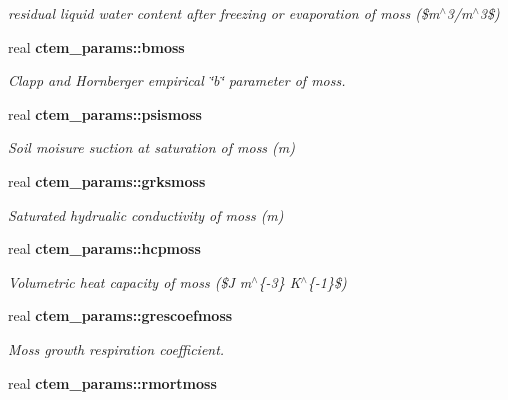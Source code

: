 \begin{DoxyCompactItemize}
\begin{DoxyCompactList}\small\item\em residual liquid water content after freezing or evaporation of moss (\$m$^\wedge$3/m$^\wedge$3\$) \end{DoxyCompactList}\item 
\hypertarget{namespacectem__params_a23ae1a2b2657682100b05a0a5554f36f}{}real {\bfseries ctem\+\_\+params\+::bmoss}\label{namespacectem__params_a23ae1a2b2657682100b05a0a5554f36f}

\begin{DoxyCompactList}\small\item\em Clapp and Hornberger empirical \char`\"{}b\char`\"{} parameter of moss. \end{DoxyCompactList}\item 
\hypertarget{namespacectem__params_a01402bac0f2145c50c4b89642cb58a80}{}real {\bfseries ctem\+\_\+params\+::psismoss}\label{namespacectem__params_a01402bac0f2145c50c4b89642cb58a80}

\begin{DoxyCompactList}\small\item\em Soil moisure suction at saturation of moss (m) \end{DoxyCompactList}\item 
\hypertarget{namespacectem__params_ac6a30c2dccbba72bd498bed33c71aef4}{}real {\bfseries ctem\+\_\+params\+::grksmoss}\label{namespacectem__params_ac6a30c2dccbba72bd498bed33c71aef4}

\begin{DoxyCompactList}\small\item\em Saturated hydrualic conductivity of moss (m) \end{DoxyCompactList}\item 
\hypertarget{namespacectem__params_a0f0a4776ea1f469d534620de349cc638}{}real {\bfseries ctem\+\_\+params\+::hcpmoss}\label{namespacectem__params_a0f0a4776ea1f469d534620de349cc638}

\begin{DoxyCompactList}\small\item\em Volumetric heat capacity of moss (\$\+J m$^\wedge$\{-\/3\} K$^\wedge$\{-\/1\}\$) \end{DoxyCompactList}\item 
\hypertarget{namespacectem__params_ab81d40d45c446f0354132a51770591b5}{}real {\bfseries ctem\+\_\+params\+::grescoefmoss}\label{namespacectem__params_ab81d40d45c446f0354132a51770591b5}

\begin{DoxyCompactList}\small\item\em Moss growth respiration coefficient. \end{DoxyCompactList}\item 
\hypertarget{namespacectem__params_aab2faf4382f8e84aa1fe0ae95f1b3a25}{}real {\bfseries ctem\+\_\+params\+::rmortmoss}\label{namespacectem__params_aab2faf4382f8e84aa1fe0ae95f1b3a25}


\end{DoxyCompactItemize}
